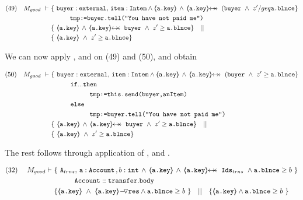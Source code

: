\begin{proofO}
 \small
\begin{align*}
\text{(49)} \ \ \ M_{good}\  \vdash \ & \{ \ \prg{buyer}:\prg{external},\, \prg{item}:\prg{Intem} \wedge {\inside{\prg{a.key}}} \, \wedge\, 
\protectedFrom {\prg{a.key}} {(\prg{buyer}}  \  \wedge\ z'/geq  \prg{a.\balance}  \} \\
		  		& \SPT  \prg{tmp:=buyer.tell("You have not paid me")}\ \\  
		  		& \{ \ \inside{\prg{a.key}} \, \wedge\, 
\protectedFrom {\prg{a.key}} {\prg{buyer}} \ \wedge\ z'\geq \prg{a.\balance}  \} \ \ \  || \ \ \  \\
		  		&   \{ \   {\inside{\prg{a.key}}}\  \wedge\ z'\geq  \prg{a.\balance}  \}
\end{align*}
\normalsize 

We can now apply  {\sc{[If\_Rule}}, and {\sc{[Conseq}} on (49) and (50),  and obtain

 \small
\begin{align*}
\text{(50)} \ \ \ M_{good}\  \vdash \ & \{ \ \prg{buyer}:\prg{external},\, \prg{item}:\prg{Intem} \wedge {\inside{\prg{a.key}}} \, \wedge\, 
\protectedFrom {\prg{a.key}} {(\prg{buyer}}  \  \wedge\ z'\geq  \prg{a.\balance}  \} \\
		  		& \SPT  \prg{if} ... \prg{then}\\
				& \SPT \SPT  \prg{tmp:=this.send(buyer,anItem)}\ \\  
				& \SPT  \prg{else}\\
				& \SPT \SPT  \prg{tmp:=buyer.tell("You have not paid me")}\ \\  
		  		& \{ \ \inside{\prg{a.key}} \, \wedge\, 
\protectedFrom {\prg{a.key}} {\prg{buyer}} \ \wedge\ z'\geq \prg{a.\balance}  \} \ \ \  || \ \ \  \\
		  		&   \{ \   {\inside{\prg{a.key}}}\  \wedge\ z'\geq  \prg{a.\balance}  \}
\end{align*}
\normalsize 

The rest follows through application of {\sc{[Prot\_Int}}, and {\sc{[Seq]}}.



\end{proofO}

\begin{lemma}

 \small
 \begin{align*}
\text{(32)}  \ \ \ \ M_{good} \vdash \ 
		&	\{  \ \Alocalstr, \, \prg{a}:\prg{Account}\, , b:\prg{int} \, \wedge\,  {\inside{\prg{a.key}}} \, \wedge \, \protectedFrom {\prg{a.key}} {\Idstr}  \ \wedge \prg{a.\balance}\geq b \  \} \\
		& \SPT \prg{Account}::\prg{transfer}.\prg{body}\ \\  
		& \{ {\inside{\prg{a.key}}}\ \wedge\ {\PushASLong {\prg{res}} {\inside{\prg{a.key}}} } \wedge \prg{a.\balance}\geq b \  \} \ \ \  || \ \ \ 
		   \{ {\inside{\prg{a.key}}} \wedge \prg{a.\balance}\geq b \  \}
\end{align*}
\normalsize


\end{lemma}

